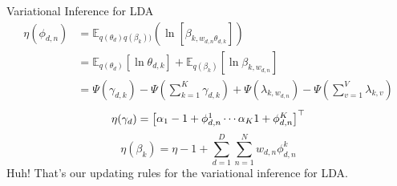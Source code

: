 \begin{frame}[allowframebreaks]{Variational Inference for LDA}
    \framebreak
    \begin{align*}
    \eta(\phi_{d,n}) & = \mathbb{E}_{q(\theta_d) q(\beta_k))}(\ln [\beta_{k, w_{d,n}\theta_{d,k}}]) \\
    & = \mathbb{E}_{q(\theta_d)}[\ln \theta_{d,k}] + \mathbb{E}_{q(\beta_k)}[\ln \beta_{k, w_{d,n}}] \\ 
    & = \Psi(\gamma_{d,k}) - \Psi(\sum_{k=1}^K \gamma_{d,k}) + \Psi(\lambda_{k,w_{d,n}}) - \Psi(\sum_{v=1}^V \lambda_{k,v})
    \end{align*}
    $$\eta(\gamma_d) = \begin{bmatrix}\alpha_1 - 1 + \phi_{d,n}^1 \cdots \alpha_K 1 + \phi_{d,n}^K\end{bmatrix}^\top$$
    $$\eta(\beta_k) = \eta -1 + \sum_{d=1}^D\sum_{n=1}^N w_{d,n} \phi_{d,n}^k$$
    Huh! That's our updating rules for the variational inference for LDA.
    
    \end{frame}
